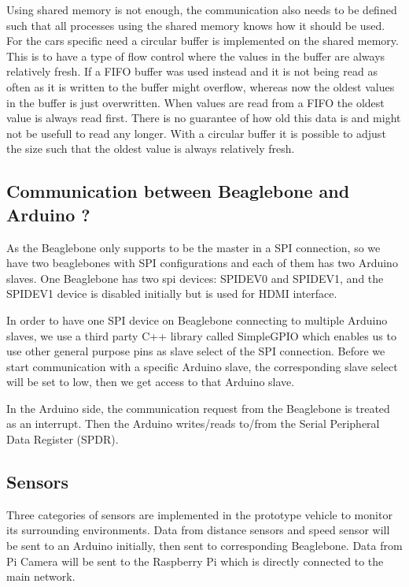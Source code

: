 \documentclass[11pt, titlepage]{article} %
\begin{document}
Using shared memory is not enough, the communication also needs to be defined such that all processes using the shared memory knows how it should be used. For the cars specific need a circular buffer is implemented on the shared memory. This is to have a type of flow control where the values in the buffer are always relatively fresh. If a FIFO buffer was used instead and it is not being read as often as it is written to  the buffer might overflow, whereas now the oldest values in the buffer is just overwritten. When values are read from a FIFO the oldest value is always read first. There is no guarantee of how old this data is and might not be usefull to read any longer. With a circular buffer it is possible to adjust the size such that the oldest value is always relatively fresh.


\subsection{Communication between Beaglebone and Arduino ?}
As the Beaglebone only supports to be the master in a SPI connection, so we have two beaglebones with SPI configurations and each of them has two Arduino slaves. One Beaglebone has two spi devices: SPIDEV0 and SPIDEV1, and the SPIDEV1 device is disabled initially but is used for HDMI interface. 

In order to have one SPI device on Beaglebone connecting to multiple Arduino slaves, we use a third party C++ library called SimpleGPIO which enables us to use other general purpose pins as slave select of the SPI connection. Before we start communication with a specific Arduino slave, the corresponding slave select will be set to low, then we get access to that Arduino slave.

In the Arduino side, the communication request from the Beaglebone is treated as an interrupt. Then the Arduino writes/reads to/from the Serial Peripheral Data Register (SPDR). 
\subsection{Sensors}
Three categories of sensors are implemented in the prototype vehicle to monitor its surrounding environments. Data from distance sensors and speed sensor will be sent to an Arduino initially, then sent to corresponding Beaglebone. Data from Pi Camera will be sent to the Raspberry Pi which is directly connected to the main network.
\end{document}
